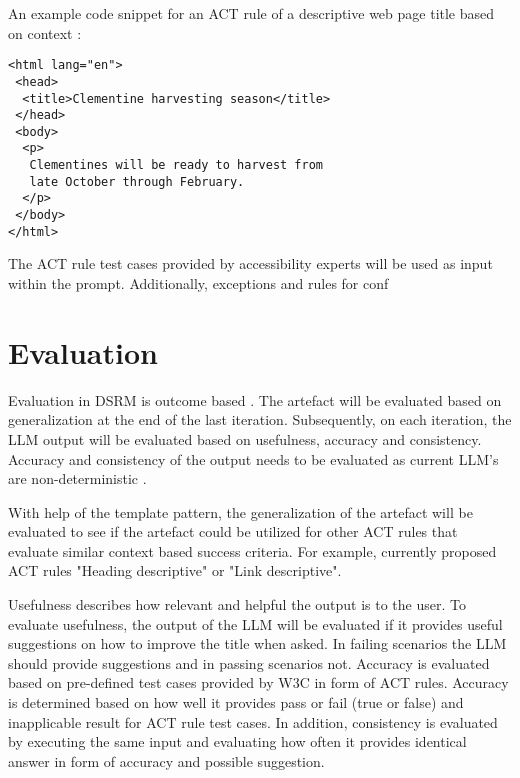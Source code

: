 An example code snippet for an ACT rule of a descriptive web page title based on context \citep{act_rule_g88}:

\begin{verbatim}
<html lang="en">
 <head>
  <title>Clementine harvesting season</title>
 </head>
 <body>
  <p>
   Clementines will be ready to harvest from 
   late October through February.
  </p>
 </body>
</html>
\end{verbatim}

The ACT rule test cases provided by accessibility experts will be used as input within the prompt. Additionally, \textcite{act_rule_g88} exceptions and rules for conf

\section{Evaluation}

Evaluation in DSRM is outcome based \citep{design_science_eval}. The artefact will be evaluated based on generalization at the end of the last iteration. Subsequently, on each iteration, the LLM output will be evaluated based on usefulness, accuracy and consistency. Accuracy and consistency of the output needs to be evaluated as current LLM's are non-deterministic \citep{ouyang2023llm, power_determinism}.

With help of the template pattern, the generalization of the artefact will be evaluated to see if the artefact could be utilized for other ACT rules that evaluate similar context based success criteria. For example, currently proposed ACT rules "Heading descriptive" or "Link descriptive".

Usefulness describes how relevant and helpful the output is to the user. To evaluate usefulness, the output of the LLM will be evaluated if it provides useful suggestions on how to improve the title when asked. In failing scenarios the LLM should provide suggestions and in passing scenarios not. Accuracy is evaluated based on pre-defined test cases provided by W3C in form of ACT rules. Accuracy is determined based on how well it provides pass or fail (true or false) and inapplicable result for ACT rule test cases. In addition, consistency is evaluated by executing the same input and evaluating how often it provides identical answer in form of accuracy and possible suggestion. 


